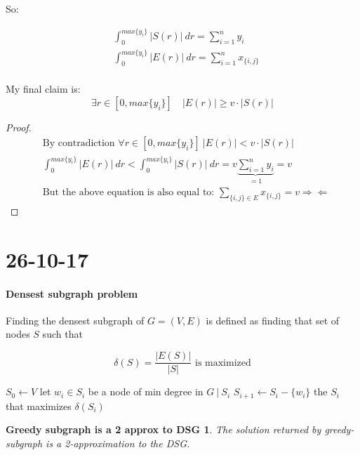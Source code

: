 \documentclass[]{article}
\begin{document}
	So:
	
	\begin{align*}
	&\int_{0}^{max\{y_i\}}|S(r)|\ dr = \sum_{i=1}^{n} y_i\\
	&\int_{0}^{max\{y_i\}} |E(r)|\ dr = \sum_{i=1}^{n} x_{\{i, j\}}\\
	\end{align*}
	
	My final claim is:
	\[
	\exists r \in [0, max\{y_i\}]\quad |E(r)| \geq v\cdot|S(r)|
	\]
	
	\begin{proof}
		

	\begin{align*}
	&\text{By contradiction }\forall r \in [0, max\{y_i\}]\ |E(r)| < v\cdot|S(r)|\\
	&\int_{0}^{max\{y_i\}} |E(r)|\ dr < \int_{0}^{max\{y_i\}}|S(r)|\ dr = v \underbrace{\sum_{i=1}^{n} y_i}_{=1} = v\\
	& \text{But the above equation is also equal to: } \sum_{\{i, j\} \in E} x_{\{i, j\}} = v \Longrightarrow\!\Longleftarrow
	\end{align*}
	\end{proof}

\section{26-10-17}

\paragraph{Densest subgraph problem} Finding the densest subgraph of $G=(V,E)$ is defined as finding that set of nodes $S$ such that 

\[
\delta (S) = \frac{|E(S)|}{|S|} \text{ is maximized}
\]

\begin{algorithm}[H]
	\caption{Greedy-Subgraph( graph: G)}
	\label{alg:sub-greedy}
	\begin{algorithmic}
		\STATE $S_0 \leftarrow V$
		\STATE let $w_i \in S_i$ be a node of min degree in $G\ |\ S_i$
		\STATE $S_{i+1} \leftarrow S_i - \{w_i\}$
		\ENDFOR
		\RETURN the $S_i$ that maximizes $\delta(S_i)$
	\end{algorithmic}
\end{algorithm}

\newtheorem{subgraphbound}{Greedy subgraph is a 2 approx to DSG}

\begin{subgraphbound}
The solution returned by greedy-subgraph is a 2-approximation to the DSG.
\end{subgraphbound}
\end{document}

